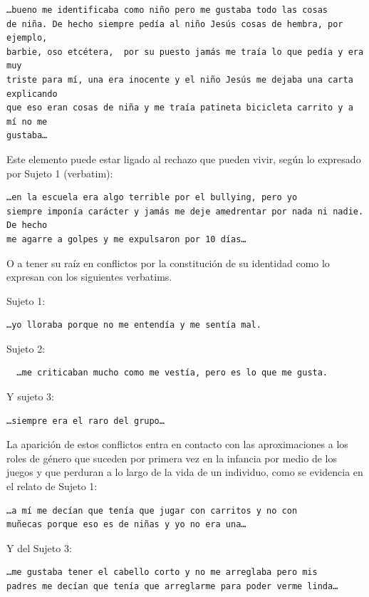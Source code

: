 \begin{verbatim}
…bueno me identificaba como niño pero me gustaba todo las cosas
de niña. De hecho siempre pedía al niño Jesús cosas de hembra, por ejemplo,
barbie, oso etcétera,  por su puesto jamás me traía lo que pedía y era muy
triste para mí, una era inocente y el niño Jesús me dejaba una carta explicando
que eso eran cosas de niña y me traía patineta bicicleta carrito y a mí no me
gustaba…
\end{verbatim}

Este elemento puede estar ligado al rechazo que pueden vivir, según lo expresado
por Sujeto 1 (verbatim):

\begin{verbatim}
…en la escuela era algo terrible por el bullying, pero yo
siempre imponía carácter y jamás me deje amedrentar por nada ni nadie.  De hecho
me agarre a golpes y me expulsaron por 10 días…
\end{verbatim}

O a tener su raíz en conflictos por la constitución de su identidad como lo
expresan con los siguientes verbatims.

Sujeto 1:
\begin{verbatim}
…yo lloraba porque no me entendía y me sentía mal.
\end{verbatim}

Sujeto 2:

\begin{verbatim}
  …me criticaban mucho como me vestía, pero es lo que me gusta.
\end{verbatim}

Y sujeto 3:

\begin{verbatim}
…siempre era el raro del grupo…
\end{verbatim}

La aparición de estos conflictos entra en contacto con las aproximaciones a los
roles de género que suceden por primera vez en la infancia por medio de los
juegos y que perduran a lo largo de la vida de un individuo, como se evidencia
en el relato de Sujeto 1:

\begin{verbatim}
…a mí me decían que tenía que jugar con carritos y no con
muñecas porque eso es de niñas y yo no era una…
\end{verbatim}

Y del Sujeto 3:

\begin{verbatim}
…me gustaba tener el cabello corto y no me arreglaba pero mis
padres me decían que tenía que arreglarme para poder verme linda…
\end{verbatim}

